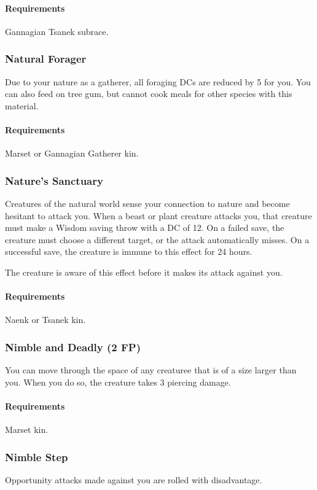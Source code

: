     \paragraph{Requirements} Gannagian Tsanek subrace.
\subsubsection{Natural Forager} \label{feat::naturalforager}
    Due to your nature as a gatherer, all foraging DCs are reduced by 5 for you.
    You can also feed on tree gum, but cannot cook meals for other species with this material.
    \paragraph{Requirements} Marset or Gannagian Gatherer kin.
\subsubsection{Nature's Sanctuary} \label{feat::naturessanctuary}
    Creatures of the natural world sense your connection to nature and become hesitant to attack you.
    When a beast or plant creature attacks you, that creature must make a Wisdom saving throw with a DC of 12.
    On a failed save, the creature must choose a different target, or the attack automatically misses.
    On a successful save, the creature is immune to this effect for 24 hours.

    The creature is aware of this effect before it makes its attack against you.
    \paragraph{Requirements} Naenk or Tsanek kin.
\subsubsection{Nimble and Deadly (2 FP)} \label{feat::nimbleanddeadly}
    You can move through the space of any creaturee that is of a size larger than you.
    When you do so, the creature takes 3 piercing damage.
    \paragraph{Requirements} Marset kin.
\subsubsection{Nimble Step} \label{feat::nimblestep}
    Opportunity attacks made against you are rolled with disadvantage.
